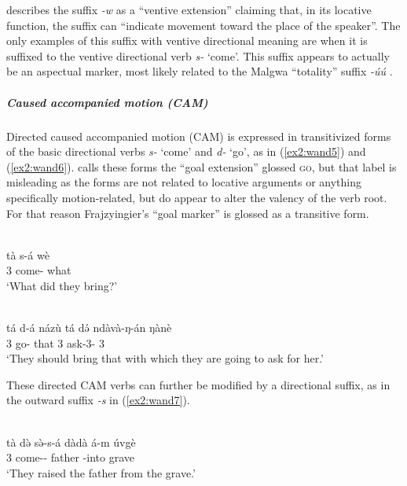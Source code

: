 \citet[248--256]{frajzyngierGrammarWandala2012} describes the suffix \textit{-w} as a ``ventive extension'' claiming that, in its locative function, the suffix can ``indicate movement toward the place of the speaker''. The only examples of this suffix with ventive directional meaning are when it is suffixed to the ventive directional verb \textit{s-} `come'. This suffix appears to actually be an aspectual marker, most likely related to the Malgwa ``totality'' suffix \textit{-úú} \citep[158]{lohrSpracheMalgwaNara2002}. 

\subparagraph{Caused accompanied motion (CAM)}

Directed caused accompanied motion (CAM) is expressed in transitivized forms of the basic directional verbs \textit{s-} `come' and \textit{d-} `go', as in (\ref{ex2:wand5}) and (\ref{ex2:wand6}). \citet[271--272]{frajzyngierGrammarWandala2012} calls these forms the ``goal extension'' glossed \textsc{go}, but that label is misleading as the forms are not related to locative arguments or anything specifically motion-related, but do appear to alter the valency of the verb root. For that reason Frajzyingier's ``goal marker'' is glossed as a transitive form.

\ea\label{ex2:wand5}
 \\
\gll tà s-á wè\\
3 come- what\\
\glt `What did they bring?'

\ex\label{ex2:wand6}
 \\
\gll
tá d-á názù tá də́ ndàvà-ŋ-án ŋànè\\
3 go- that 3  ask-3- 3 \\
\glt `They should bring that with which they are going to ask for her.'
\z 

These directed CAM verbs can further be modified by a directional suffix, as in the outward suffix \textit{-s} in (\ref{ex2:wand7}). 

\ea\label{ex2:wand7}
 \\
\gll tà də̀ sə̀-s-á dàdà á-m úvgè \\
3  come-- father -into grave \\
\glt `They raised the father from the grave.'
\z

